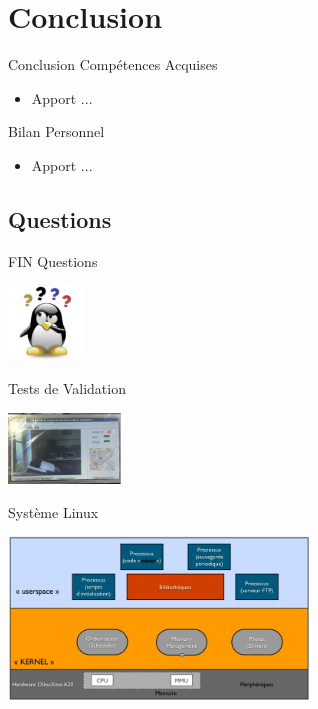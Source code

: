 \documentclass[11pt]{beamer}
\begin{document}
	\section{Conclusion}
	\begin{frame}{Conclusion}
	Compétences Acquises
		\begin{center}
		\begin{itemize}
			\item Apport ...
		\end{itemize}
		\end{center}
	Bilan Personnel
		\begin{center}
		\begin{itemize}
			\item Apport ...
		\end{itemize}
		\end{center}
	\end{frame}
	
	\subsection{Questions}
	\begin{frame}{FIN}
	Questions 
		\begin{center}
		  \includegraphics[width=2cm]{common/dialog-question.png}
		\end{center}
	Tests de Validation
		\begin{center}
		  \includegraphics[width=3cm]{common/appli.png}
		\end{center}
	\end{frame}
	
	\begin{frame}[label=Linux]{Système Linux}
	 \begin{center}
		\includegraphics[width=8cm]{common/kernel.png}
	 \end{center}
	\hyperlink{Kernel}{}
	\end{frame}
	
\end{document}
